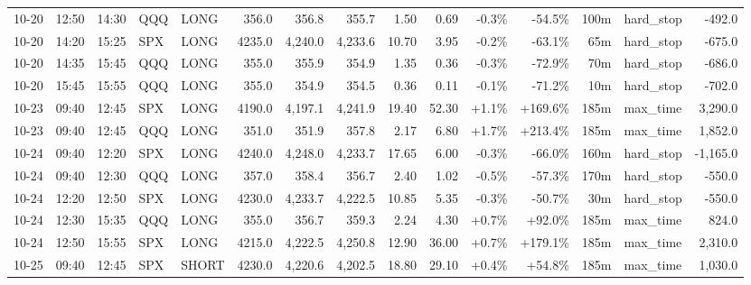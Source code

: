 \documentclass[11pt,a4paper,twoside]{article}
\begin{document}
\begin{landscape}
\begin{center}
\begin{longtable}{>{\color{txtmain}}l l l l l r r r r r r r r >{\color{txtmain}}l r}
10-20 & 12:50 & 14:30 & QQQ & LONG & 356.0 & 356.8 & 355.7 & 1.50 & 0.69 & \textcolor{lossred}{-0.3\%} & \textcolor{lossred}{-54.5\%} & 100m & hard\_stop & \textcolor{lossred}{-492.0} \\
10-20 & 14:20 & 15:25 & SPX & LONG & 4235.0 & 4,240.0 & 4,233.6 & 10.70 & 3.95 & \textcolor{lossred}{-0.2\%} & \textcolor{lossred}{-63.1\%} & 65m & hard\_stop & \textcolor{lossred}{-675.0} \\
10-20 & 14:35 & 15:45 & QQQ & LONG & 355.0 & 355.9 & 354.9 & 1.35 & 0.36 & \textcolor{lossred}{-0.3\%} & \textcolor{lossred}{-72.9\%} & 70m & hard\_stop & \textcolor{lossred}{-686.0} \\
10-20 & 15:45 & 15:55 & QQQ & LONG & 355.0 & 354.9 & 354.5 & 0.36 & 0.11 & \textcolor{lossred}{-0.1\%} & \textcolor{lossred}{-71.2\%} & 10m & hard\_stop & \textcolor{lossred}{-702.0} \\
10-23 & 09:40 & 12:45 & SPX & LONG & 4190.0 & 4,197.1 & 4,241.9 & 19.40 & 52.30 & \textcolor{wingreen}{+1.1\%} & \textcolor{wingreen}{+169.6\%} & 185m & max\_time & \textcolor{wingreen}{3,290.0} \\
10-23 & 09:40 & 12:45 & QQQ & LONG & 351.0 & 351.9 & 357.8 & 2.17 & 6.80 & \textcolor{wingreen}{+1.7\%} & \textcolor{wingreen}{+213.4\%} & 185m & max\_time & \textcolor{wingreen}{1,852.0} \\
10-24 & 09:40 & 12:20 & SPX & LONG & 4240.0 & 4,248.0 & 4,233.7 & 17.65 & 6.00 & \textcolor{lossred}{-0.3\%} & \textcolor{lossred}{-66.0\%} & 160m & hard\_stop & \textcolor{lossred}{-1,165.0} \\
10-24 & 09:40 & 12:30 & QQQ & LONG & 357.0 & 358.4 & 356.7 & 2.40 & 1.02 & \textcolor{lossred}{-0.5\%} & \textcolor{lossred}{-57.3\%} & 170m & hard\_stop & \textcolor{lossred}{-550.0} \\
10-24 & 12:20 & 12:50 & SPX & LONG & 4230.0 & 4,233.7 & 4,222.5 & 10.85 & 5.35 & \textcolor{lossred}{-0.3\%} & \textcolor{lossred}{-50.7\%} & 30m & hard\_stop & \textcolor{lossred}{-550.0} \\
10-24 & 12:30 & 15:35 & QQQ & LONG & 355.0 & 356.7 & 359.3 & 2.24 & 4.30 & \textcolor{wingreen}{+0.7\%} & \textcolor{wingreen}{+92.0\%} & 185m & max\_time & \textcolor{wingreen}{824.0} \\
10-24 & 12:50 & 15:55 & SPX & LONG & 4215.0 & 4,222.5 & 4,250.8 & 12.90 & 36.00 & \textcolor{wingreen}{+0.7\%} & \textcolor{wingreen}{+179.1\%} & 185m & max\_time & \textcolor{wingreen}{2,310.0} \\
10-25 & 09:40 & 12:45 & SPX & SHORT & 4230.0 & 4,220.6 & 4,202.5 & 18.80 & 29.10 & \textcolor{wingreen}{+0.4\%} & \textcolor{wingreen}{+54.8\%} & 185m & max\_time & \textcolor{wingreen}{1,030.0} \\

\end{longtable}
\end{center}
\end{landscape}
\end{document}
